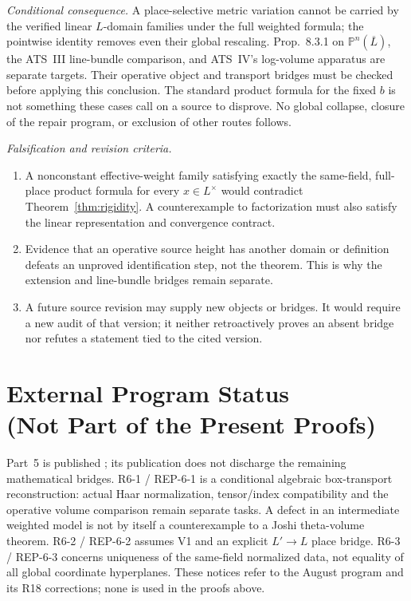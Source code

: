\documentclass[11pt,a4paper]{article}
\theoremstyle{definition}
\theoremstyle{remark}
\begin{document}
\emph{Conditional consequence.} A place-selective metric variation cannot
be carried by the verified linear $L$-domain families under the full
weighted formula; the pointwise identity removes even their global
rescaling. Prop.~8.3.1 on $\mathbb P^n(\overline L)$, the ATS~III
line-bundle comparison, and ATS~IV's log-volume apparatus are separate
targets. Their operative object and transport bridges must be checked
before applying this conclusion. The standard product formula for the
fixed $b$ is not something these cases call on a source to disprove.
No global collapse, closure of the repair program, or exclusion of other
routes follows.

\emph{Falsification and revision criteria.}
\begin{enumerate}
\item A nonconstant effective-weight family satisfying exactly the same-field,
full-place product formula for every $x\in L^\times$ would contradict
Theorem~\ref{thm:rigidity}. A counterexample to factorization must also
satisfy the linear representation and convergence contract.
\item Evidence that an operative source height has another domain or
definition defeats an unproved identification step, not the theorem.
This is why the extension and line-bundle bridges remain separate.
\item A future source revision may supply new objects or bridges.
It would require a new audit of that version; it neither retroactively
proves an absent bridge nor refutes a statement tied to the cited version.
\end{enumerate}

\section[External Program Status (Not Part of Present Proofs)]{External Program Status\texorpdfstring{\\}{ }(Not Part of the Present Proofs)}\label{sec:notices}

Part~5 is published \cite{part5}; its publication does not discharge the
remaining mathematical bridges. R6-1 / REP-6-1 is a conditional algebraic
box-transport reconstruction: actual Haar normalization, tensor/index
compatibility and the operative volume comparison remain separate tasks.
A defect in an intermediate weighted model is not by itself a
counterexample to a Joshi theta-volume theorem.
R6-2 / REP-6-2 assumes V1 and an explicit $L'\to L$ place bridge.
R6-3 / REP-6-3 concerns uniqueness of the same-field normalized data,
not equality of all global coordinate hyperplanes.
These notices refer to the August program and its R18 corrections;
none is used in the proofs above.
\end{document}
